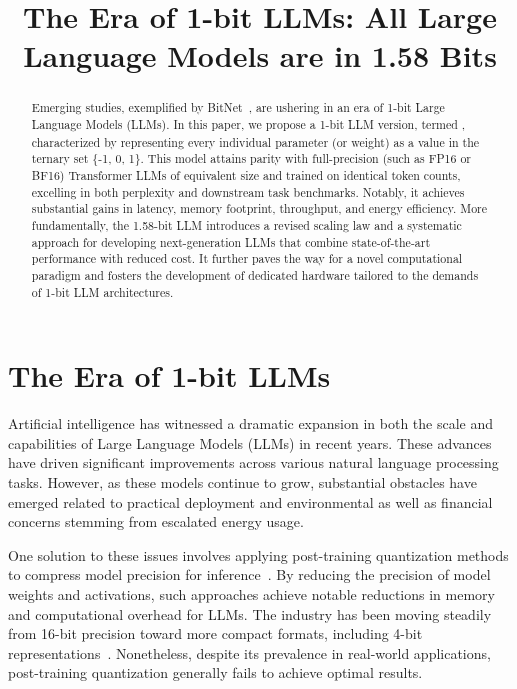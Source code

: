 \title{The Era of 1-bit LLMs: All Large Language Models are in 1.58 Bits}

\begin{abstract}
Emerging studies, exemplified by BitNet~\cite{bitnet}, are ushering in an era of 1-bit Large Language Models (LLMs). In this paper, we propose a 1-bit LLM version, termed \textbf{}, characterized by representing every individual parameter (or weight) as a value in the ternary set \{-1, 0, 1\}. This model attains parity with full-precision (such as FP16 or BF16) Transformer LLMs of equivalent size and trained on identical token counts, excelling in both perplexity and downstream task benchmarks. Notably, it achieves substantial gains in latency, memory footprint, throughput, and energy efficiency. More fundamentally, the 1.58-bit LLM introduces a revised scaling law and a systematic approach for developing next-generation LLMs that combine state-of-the-art performance with reduced cost. It further paves the way for a novel computational paradigm and fosters the development of dedicated hardware tailored to the demands of 1-bit LLM architectures.
\end{abstract}

\section{The Era of 1-bit LLMs}

Artificial intelligence has witnessed a dramatic expansion in both the scale and capabilities of Large Language Models (LLMs) in recent years. These advances have driven significant improvements across various natural language processing tasks. However, as these models continue to grow, substantial obstacles have emerged related to practical deployment and environmental as well as financial concerns stemming from escalated energy usage.

One solution to these issues involves applying post-training quantization methods to compress model precision for inference~\cite{smoothquant, gptq, quip, quip_sharp}. By reducing the precision of model weights and activations, such approaches achieve notable reductions in memory and computational overhead for LLMs. The industry has been moving steadily from 16-bit precision toward more compact formats, including 4-bit representations~\cite{gptq, awq}. Nonetheless, despite its prevalence in real-world applications, post-training quantization generally fails to achieve optimal results.

